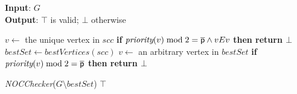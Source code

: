 \documentclass[letterpaper]{article} %
\begin{document}

\begin{algorithm}[tb]
\small
\caption{\textbf{\textit{NOCChecker}}}
\textbf{Input}: $G$ \\
\textbf{Output}: $\top$ is valid; $\bot$ otherwise
\begin{algorithmic}[1]
     \label{alg:noc-checker:breakingdown}
         \label{alg:noc-checker:single}
            \STATE $v \gets$ the unique vertex in $scc$
            \STATE \textbf{if }$\textit{priority}(v) \bmod 2 = \opponent \land vEv$ \textbf{then return $\bot$} \label{alg:noc-checker:self}  
        \ELSE
            \STATE $bestSet \gets \textit{bestVertices}(scc)$ \label{alg:noc-checker:best}
            \STATE $v \gets$ an arbitrary vertex in $bestSet$
            \STATE \textbf{if }$\textit{priority}(v) \bmod 2 = \opponent$ \textbf{then return $\bot$} \label{alg:noc-checker:opponent}  

            \STATE \textit{NOCChecker}($G \setminus bestSet$) \label{alg:noc-checker:recursion}
        \ENDIF
    \ENDFOR
    \RETURN $\top$
\end{algorithmic}
\label{alg:noc-checker}
\end{algorithm}
\end{document}

